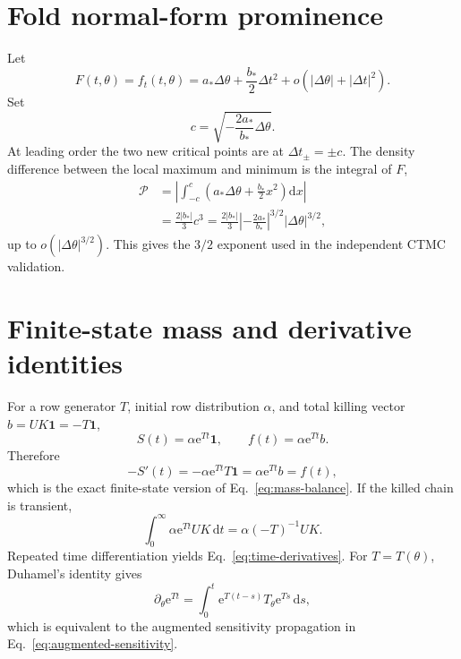 \documentclass[aps,pre,reprint,amsmath,amssymb,longbibliography,floatfix]{revtex4-2}
\newcommand{\dd}{\mathrm d}
\newcommand{\e}{\mathrm e}
\renewcommand{\thesection}{S\arabic{section}}
\renewcommand{\thesubsection}{S\arabic{section}.\arabic{subsection}}
\renewcommand{\thesubsubsection}{S\arabic{section}.\arabic{subsection}.\arabic{subsubsection}}
\renewcommand{\theequation}{S\arabic{equation}}
\begin{document}
\appendix
\renewcommand{\thesection}{S\Alph{section}}
\renewcommand{\thesubsection}{S\Alph{section}.\arabic{subsection}}
\renewcommand{\thesubsubsection}{S\Alph{section}.\arabic{subsection}.\arabic{subsubsection}}
\renewcommand{\theequation}{S\Alph{section}\arabic{equation}}

\section{Fold normal-form prominence}
\label{app:normal-form}

Let
\begin{equation}
F(t,\theta)=f_t(t,\theta)
=a_*\Delta\theta+\frac{b_*}{2}\Delta t^2
+o(|\Delta\theta|+|\Delta t|^2).
\label{eq:app-normal}
\end{equation}
Set
\begin{equation}
c=\sqrt{-\frac{2a_*}{b_*}\Delta\theta}.
\label{eq:app-c}
\end{equation}
At leading order the two new critical points are at
\(\Delta t_\pm=\pm c\). The density difference between the local maximum and
minimum is the integral of \(F\),
\begin{align}
\mathcal P
&=\left|\int_{-c}^{c}
\left(a_*\Delta\theta+\frac{b_*}{2}x^2\right)\dd x\right|\\
&=\frac{2|b_*|}{3}c^3
=\frac{2|b_*|}{3}
\left|-\frac{2a_*}{b_*}\right|^{3/2}
|\Delta\theta|^{3/2},
\label{eq:app-prominence}
\end{align}
up to \(o(|\Delta\theta|^{3/2})\). This gives the \(3/2\) exponent used in
the independent CTMC validation.

\section{Finite-state mass and derivative identities}
\label{app:finite-identities}

For a row generator \(T\), initial row distribution \(\alpha\), and total
killing vector \(b=UK\bm1=-T\bm1\),
\begin{equation}
S(t)=\alpha\e^{Tt}\bm1,\qquad
f(t)=\alpha\e^{Tt}b.
\label{eq:app-survival}
\end{equation}
Therefore
\begin{equation}
-S'(t)=-\alpha\e^{Tt}T\bm1
=\alpha\e^{Tt}b=f(t),
\label{eq:app-mass}
\end{equation}
which is the exact finite-state version of
Eq.~\eqref{eq:mass-balance}. If the killed chain is transient,
\begin{equation}
\int_0^\infty \alpha\e^{Tt}UK\,\dd t
=\alpha(-T)^{-1}UK.
\label{eq:app-splitting}
\end{equation}
Repeated time differentiation yields
Eq.~\eqref{eq:time-derivatives}. For \(T=T(\theta)\), Duhamel's identity gives
\begin{equation}
\partial_\theta\e^{Tt}
=\int_0^t\e^{T(t-s)}T_\theta\e^{Ts}\,\dd s,
\label{eq:app-duhamel}
\end{equation}
which is equivalent to the augmented sensitivity propagation in
Eq.~\eqref{eq:augmented-sensitivity}.
\end{document}
